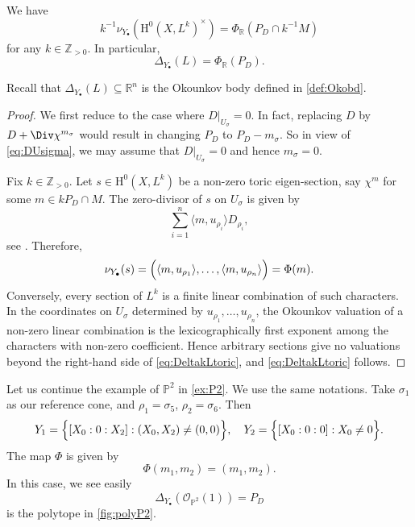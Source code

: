 \begin{proposition}\label{prop:toricusualOko}
    We have
    \begin{equation}\label{eq:DeltakLtoric}
        k^{-1}\nu_{Y_{\bullet}}\left(\mathrm{H}^0(X,L^k)^{\times} \right)=\Phi_{\mathbb{R}} \left(P_{D}\cap k^{-1}M\right)
    \end{equation}
    for any $k\in \mathbb{Z}_{>0}$.
    In particular,
    \begin{equation}
        \Delta_{Y_{\bullet}}(L)=\Phi_{\mathbb{R}}(P_D).
    \end{equation}
\end{proposition}
Recall that $\Delta_{Y_{\bullet}}(L)\subseteq \mathbb{R}^n$ is the Okounkov body defined in \cref{def:Okobd}.
\begin{proof}
    We first reduce to the case where $D|_{U_{\sigma}}=0$. In fact, replacing $D$ by $D+\Div \chi^{m_{\sigma}}$ would result in changing $P_D$ to $P_D-m_{\sigma}$. So in view of \eqref{eq:DUsigma}, we may assume that $D|_{U_{\sigma}}=0$ and hence $m_{\sigma}=0$.

    Fix $k\in \mathbb{Z}_{>0}$. Let $s\in \mathrm{H}^0(X,L^k)$ be a non-zero toric eigen-section, say $\chi^m$ for some $m\in kP_D\cap M$. The zero-divisor of $s$ on $U_{\sigma}$ is given by
    \[
        \sum_{i=1}^n \langle m, u_{\rho_i} \rangle D_{\rho_i},
    \]
    see \cite[Proposition~4.1.2]{CLS11}.
    Therefore,
    \[
    \nu_{Y_{\bullet}}(s)=\Bigl(\langle m, u_{\rho_1} \rangle,\dots,\langle m, u_{\rho_n} \rangle \Bigr)=\Phi(m).
    \]
    Conversely, every section of $L^k$ is a finite linear combination of such characters. In the coordinates on $U_{\sigma}$ determined by $u_{\rho_1},\ldots,u_{\rho_n}$, the Okounkov valuation of a non-zero linear combination is the lexicographically first exponent among the characters with non-zero coefficient. Hence arbitrary sections give no valuations beyond the right-hand side of \eqref{eq:DeltakLtoric}, and \eqref{eq:DeltakLtoric} follows.
\end{proof}


\begin{example}\label{ex:OkounP2}
    Let us continue the example of $\mathbb{P}^2$ in \cref{ex:P2}. We use the same notations. Take $\sigma_1$ as our reference cone, and $\rho_1=\sigma_5$, $\rho_2=\sigma_6$. Then
    \[
    Y_1=\Bigl\{[X_0:0:X_2]:(X_0,X_2)\neq (0,0) \Bigr\},\quad Y_2=\Bigl\{[X_0:0:0]:X_0\neq 0\Bigr\}.
    \]
    The map $\Phi$ is given by
    \[
    \Phi(m_1,m_2)=(m_1,m_2).
    \]
    In this case, we see easily
    \[
    \Delta_{Y_{\bullet}}\left(\mathcal{O}_{\mathbb{P}^2}(1)\right)=P_D
    \]
    is the polytope in \cref{fig:polyP2}.
\end{example}

